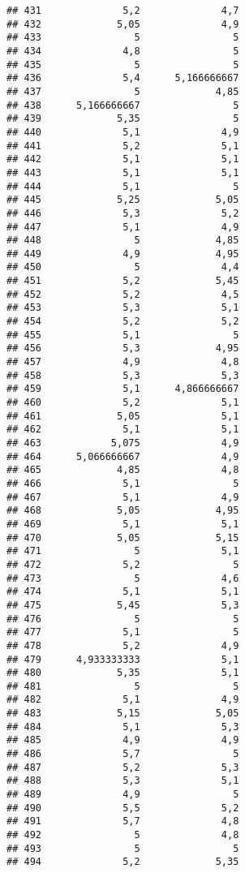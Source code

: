 \documentclass[
]{article}
\begin{document}
\begin{verbatim}
## 431              5,2              4,7
## 432             5,05              4,9
## 433                5                5
## 434              4,8                5
## 435                5                5
## 436              5,4      5,166666667
## 437                5             4,85
## 438      5,166666667                5
## 439             5,35                5
## 440              5,1              4,9
## 441              5,2              5,1
## 442              5,1              5,1
## 443              5,1              5,1
## 444              5,1                5
## 445             5,25             5,05
## 446              5,3              5,2
## 447              5,1              4,9
## 448                5             4,85
## 449              4,9             4,95
## 450                5              4,4
## 451              5,2             5,45
## 452              5,2              4,5
## 453              5,3              5,1
## 454              5,2              5,2
## 455              5,1                5
## 456              5,3             4,95
## 457              4,9              4,8
## 458              5,3              5,3
## 459              5,1      4,866666667
## 460              5,2              5,1
## 461             5,05              5,1
## 462              5,1              5,1
## 463            5,075              4,9
## 464      5,066666667              4,9
## 465             4,85              4,8
## 466              5,1                5
## 467              5,1              4,9
## 468             5,05             4,95
## 469              5,1              5,1
## 470             5,05             5,15
## 471                5              5,1
## 472              5,2                5
## 473                5              4,6
## 474              5,1              5,1
## 475             5,45              5,3
## 476                5                5
## 477              5,1                5
## 478              5,2              4,9
## 479      4,933333333              5,1
## 480             5,35              5,1
## 481                5                5
## 482              5,1              4,9
## 483             5,15             5,05
## 484              5,1              5,3
## 485              4,9              4,9
## 486              5,7                5
## 487              5,2              5,3
## 488              5,3              5,1
## 489              4,9                5
## 490              5,5              5,2
## 491              5,7              4,8
## 492                5              4,8
## 493                5                5
## 494              5,2             5,35

\end{verbatim}
\end{document}
